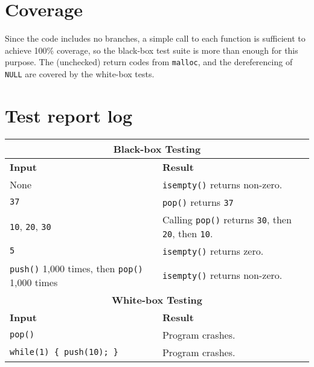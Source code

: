 \documentclass[11pt]{article}
\begin{document}
\section{Coverage}

Since the code includes no branches, a simple call to each function is sufficient to achieve 100\%
coverage, so the black-box test suite is more than enough for this purpose.  The (unchecked) return
codes from \texttt{malloc}, and the dereferencing of \texttt{NULL} are covered by the white-box
tests.

\section{Test report log}

\begin{center}
  \begin{tabular}[h]{|l|l|}
    \hline
    \multicolumn{2}{|c|}{\bf Black-box Testing}                                                                                                    \\
    \hline \hline
    \textbf{Input}                                               & \textbf{Result}                                                                 \\
    \hline \hline
    None                                                         & \texttt{isempty()} returns non-zero.                                            \\
    \texttt{37}                                                  & \texttt{pop()} returns \texttt{37}                                              \\
    \texttt{10}, \texttt{20}, \texttt{30}                        & Calling \texttt{pop()} returns \texttt{30}, then \texttt{20}, then \texttt{10}. \\
    \texttt{5}                                                   & \texttt{isempty()} returns zero.                                                \\
    \texttt{push()} 1,000 times, then \texttt{pop()} 1,000 times & \texttt{isempty()} returns non-zero.                                            \\
    \hline \hline
    \multicolumn{2}{|c|}{\bf White-box Testing}                                                                                                    \\
    \hline \hline
    \textbf{Input}                                               & \textbf{Result}                                                                 \\
    \hline \hline
    \texttt{pop()}                                               & {\color{red} Program crashes.}                                                  \\
    \texttt{while(1) \{ push(10); \}}                            & {\color{red} Program crashes.}                                                  \\
    \hline
  \end{tabular}
\end{center}
\end{document}
